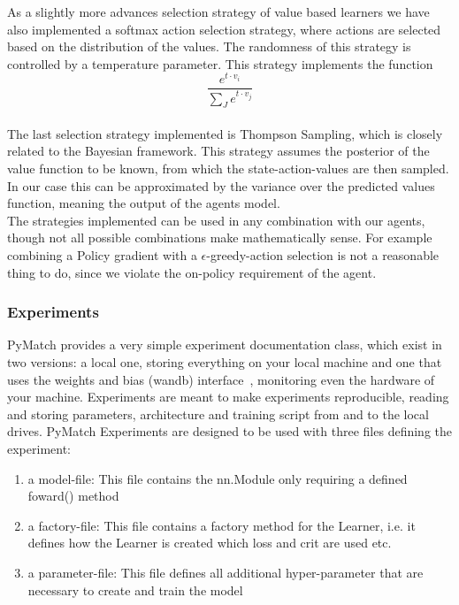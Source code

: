 \documentclass[11pt,a4paper]{article}
\begin{document}
	As a slightly more advances selection strategy of value based learners we have also implemented a softmax action selection strategy, where actions are selected based on the distribution of the values.
	The randomness of this strategy is controlled by a temperature parameter.
	This strategy implements the function
	\[\frac{e^{t \cdot v_i }}{\sum_J e^{t \cdot v_j}}\]\\

	The last selection strategy implemented is Thompson Sampling, which is closely related to the Bayesian framework.
	This strategy assumes the posterior of the value function to be known, from which the state-action-values are then sampled.
	In our case this can be approximated by the variance over the predicted values function, meaning the output of the agents model.\\

	The strategies implemented can be used in any combination with our agents, though not all possible combinations make mathematically sense.
	For example combining a Policy gradient with a $\epsilon$-greedy-action selection is not a reasonable thing to do, since we violate the on-policy requirement of the agent. %


	\subsubsection{Experiments}
	PyMatch provides a very simple experiment documentation class, which exist in two versions: a local one, storing everything on your local machine and one that uses the weights and bias (wandb) interface~\cite{noauthor_weights_nodate}, monitoring even the hardware of your machine.
	Experiments are meant to make experiments reproducible, reading and storing parameters, architecture and training script from and to the local drives.
	PyMatch Experiments are designed to be used with three files defining the experiment:
	\begin{enumerate}
		\item a model-file: This file contains the nn.Module only requiring a defined foward() method
    	\item a factory-file: This file contains a factory method for the Learner, i.e. it defines how the Learner is created which loss and crit are used etc.
    	\item a parameter-file: This file defines all additional hyper-parameter that are necessary to create and train the model
	\end{enumerate}
\end{document}
